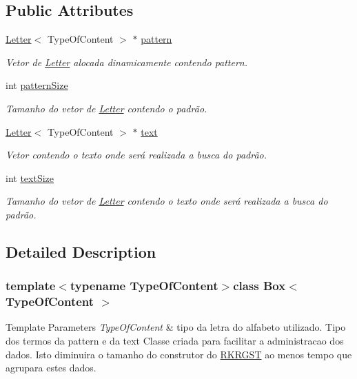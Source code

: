 \subsection*{Public Attributes}
\begin{DoxyCompactItemize}
\item 
\hyperlink{classLetter}{Letter}$<$ Type\+Of\+Content $>$ $\ast$ \hyperlink{classBox_aa1b857944564f517d12997289e5987ba}{pattern}
\begin{DoxyCompactList}\small\item\em Vetor de \hyperlink{classLetter}{Letter} alocada dinamicamente contendo pattern. \end{DoxyCompactList}\item 
int \hyperlink{classBox_acadd4d6b43a90560a093cb64aa77b7e9}{pattern\+Size}
\begin{DoxyCompactList}\small\item\em Tamanho do vetor de \hyperlink{classLetter}{Letter} contendo o padrão. \end{DoxyCompactList}\item 
\hyperlink{classLetter}{Letter}$<$ Type\+Of\+Content $>$ $\ast$ \hyperlink{classBox_a5c23fcbcde78ac65c62127c2b272ac30}{text}
\begin{DoxyCompactList}\small\item\em Vetor contendo o texto onde será realizada a busca do padrão. \end{DoxyCompactList}\item 
int \hyperlink{classBox_a2bfb2b656e74bc0f87f8acda76afbc86}{text\+Size}
\begin{DoxyCompactList}\small\item\em Tamanho do vetor de \hyperlink{classLetter}{Letter} contendo o texto onde será realizada a busca do padrão. \end{DoxyCompactList}\end{DoxyCompactItemize}


\subsection{Detailed Description}
\subsubsection*{template$<$typename Type\+Of\+Content$>$class Box$<$ Type\+Of\+Content $>$}


\begin{DoxyTemplParams}{Template Parameters}
{\em Type\+Of\+Content} & tipo da letra do alfabeto utilizado. Tipo dos termos da pattern e da text Classe criada para facilitar a administracao dos dados. Isto diminuira o tamanho do construtor do \hyperlink{classRKRGST}{R\+K\+R\+G\+S\+T} ao menos tempo que agrupara estes dados. \\
\hline
\end{DoxyTemplParams}



